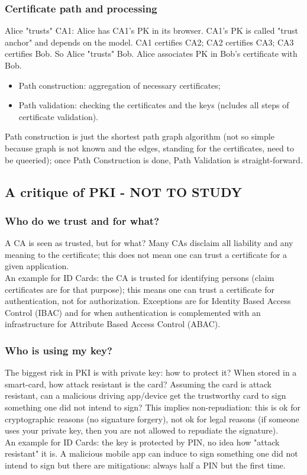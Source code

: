\documentclass[a4paper, 10pt, titlepage]{article}
\begin{document}
\subsubsection*{Certificate path and processing}
Alice "trusts" CA1: Alice has CA1’s PK in its browser. CA1’s PK is called "trust anchor" and depends on the model. 
CA1 certifies CA2; CA2 certifies CA3; CA3 certifies Bob. So Alice "trusts" Bob. 
Alice associates PK in Bob’s certificate with Bob.
\begin{itemize}
\item Path construction: aggregation of necessary certificates;
\item Path validation: checking the certificates and the keys (ncludes all steps of certificate validation).
\end{itemize}
Path construction is just the shortest path graph algorithm (not so simple because graph is not known and the edges, standing for the certificates, need to be queeried); once Path Construction is done, Path Validation is straight-forward.

\subsection{A critique of PKI - NOT TO STUDY}
\subsubsection*{Who do we trust and for what?}
A CA is seen as trusted, but for what? Many CAs disclaim all liability
and any meaning to the certificate; this does not mean one can trust a certificate for a given application. \medskip\\
An example for ID Cards: the CA is trusted for identifying persons (claim certificates are for that purpose); this means one can trust a certificate for authentication, not for authorization. Exceptions are for Identity Based Access Control (IBAC) and for when authentication is complemented with an infrastructure for Attribute Based Access Control (ABAC).
\subsubsection*{Who is using my key?}
The biggest risk in PKI is with private key: how to protect it? When stored in a smart-card, how attack resistant is the card? Assuming the card is attack resistant, can a malicious driving app/device get the trustworthy card to sign something one did not intend to sign? This implies non-repudiation: this is ok for cryptographic reasons (no signature forgery), not ok for legal reasons (if someone uses your private key, then you are not allowed to repudiate the signature). \medskip\\
An example for ID Cards: the key is protected by PIN, no idea how "attack resistant" it is. A malicious mobile app can induce to sign something one did not intend to sign but there are mitigations: always half a PIN but the first time.
\end{document}
